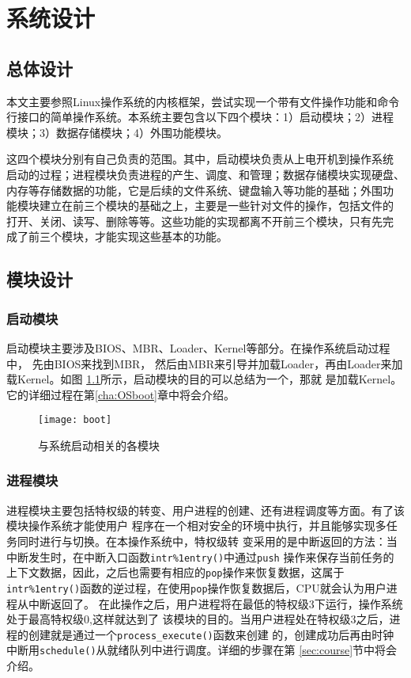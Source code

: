 \chapter{系统设计}

\section{总体设计}
\label{sec:overalldesign}

本文主要参照Linux操作系统的内核框架，尝试实现一个带有文件操作功能和命令
行接口的简单操作系统。本系统主要包含以下四个模块：1）启动模块；2）进程
模块；3）数据存储模块；4）外围功能模块。

这四个模块分别有自己负责的范围。其中，启动模块负责从上电开机到操作系统
启动的过程；进程模块负责进程的产生、调度、和管理；数据存储模块实现硬盘、
内存等存储数据的功能，它是后续的文件系统、键盘输入等功能的基础；外围功
能模块建立在前三个模块的基础之上，主要是一些针对文件的操作，包括文件的
打开、关闭、读写、删除等等。这些功能的实现都离不开前三个模块，只有先完
成了前三个模块，才能实现这些基本的功能。

\section{模块设计}

\subsection{启动模块}

启动模块主要涉及BIOS、MBR、Loader、Kernel等部分。在操作系统启动过程中，
先由BIOS来找到MBR，
然后由MBR来引导并加载Loader，再由Loader来加载Kernel。如图
\ref{fig:boot}所示，启动模块的目的可以总结为一个，那就
是加载Kernel。它的详细过程在第\ref{cha:OSboot}章中将会介绍。

\begin{figure}[H]
  \centering
  \texttt{[image: boot]}
  \caption{与系统启动相关的各模块}
  \label{fig:boot}
\end{figure}

\subsection{进程模块}

进程模块主要包括特权级的转变、用户进程的创建、还有进程调度等方面。有了该模块操作系统才能使用户
程序在一个相对安全的环境中执行，并且能够实现多任务同时进行与切换。在本操作系统中，特权级转
变采用的是中断返回的方法：当中断发生时，在中断入口函数\texttt{intr\%1entry()}中通过\texttt{push}
操作来保存当前任务的上下文数据，因此，之后也需要有相应的\texttt{pop}操作来恢复数据，这属于
\texttt{intr\%1entry()}函数的逆过程，在使用\texttt{pop}操作恢复数据后，CPU就会认为用户进程从中断返回了。
在此操作之后，用户进程将在最低的特权级3下运行，操作系统处于最高特权级0,这样就达到了
该模块的目的。当用户进程处在特权级3之后，进程的创建就是通过一个\texttt{process\_execute()}函数来创建
的，创建成功后再由时钟中断用\texttt{schedule()}从就绪队列中进行调度。详细的步骤在第
\ref{sec:course}节中将会介绍。

